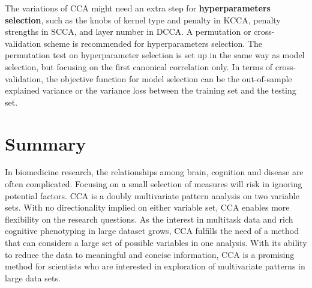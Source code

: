The variations of CCA might need an extra step for \textbf{hyperparameters selection}, such as the knobs of kernel type and penalty in KCCA, penalty strengths in SCCA, and layer number in DCCA. A permutation or cross-validation scheme is recommended for hyperparameters selection. The permutation test on hyperparameter selection is set up in the same way as model selection, but focusing on the first canonical correlation only\cite<For example, see Appendix A in>{WittenSCCA2009}. In terms of cross-validation, the objective function for model selection can be the out-of-sample explained variance or the variance loss between the training set and the testing set. 

\section{Summary}
\label{ch:methods:summary}
In biomedicine research, the relationships among brain, cognition and disease are often complicated. Focusing on a small selection of measures will risk in ignoring potential factors. CCA is a doubly multivariate pattern analysis on two variable sets.  With no directionality implied on either variable set, CCA enables more flexibility on the research questions. As the interest in multitask data and rich cognitive phenotyping in large dataset grows, CCA fulfills the need of a method that can considers a large set of possible variables in one analysis. With its ability to reduce the data to meaningful and concise information, CCA is a promising method for scientists who are interested in exploration of multivariate patterns in large data sets.